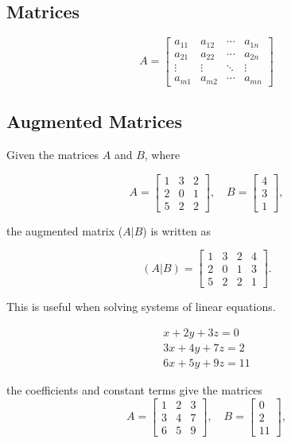 \documentclass[12pt, a4paper]{article}
\begin{document}
\author{Kevin O'Brien}

\subsection{Matrices}
\[
 A =
 \begin{bmatrix}
 a_{11} & a_{12} & \cdots & a_{1n} \\
 a_{21} & a_{22} & \cdots & a_{2n} \\
 \vdots & \vdots & \ddots & \vdots \\
 a_{m1} & a_{m2} & \cdots & a_{mn}
 \end{bmatrix}\]
 
\subsection*{Augmented Matrices}
Given the matrices $A$ and $B$, where

\[
A =
  \begin{bmatrix}
    1 & 3 & 2 \\
    2 & 0 & 1 \\
    5 & 2 & 2
  \end{bmatrix}
, \quad
B =
  \begin{bmatrix}
    4 \\
    3 \\
    1
  \end{bmatrix},
\]

the augmented matrix ($A|B$) is written as

\[
(A|B)=
  \left[\begin{array}{ccc|c}
    1 & 3 & 2 & 4 \\
    2 & 0 & 1 & 3 \\
    5 & 2 & 2 & 1
  \end{array}\right].
\]

This is useful when solving systems of linear equations.


\begin{eqnarray} \nonumber
x + 2y + 3z = 0 \\ \nonumber
3x + 4y + 7z = 2 \\ \nonumber
6x + 5y + 9z = 11 \nonumber
\end{eqnarray}

the coefficients and constant terms give the matrices
\[
A =
\begin{bmatrix}
1 & 2 & 3 \\
3 & 4 & 7 \\
6 & 5 & 9
\end{bmatrix}
, \quad
B =
\begin{bmatrix}
0 \\
2 \\
11
\end{bmatrix},
\]
\end{document}
